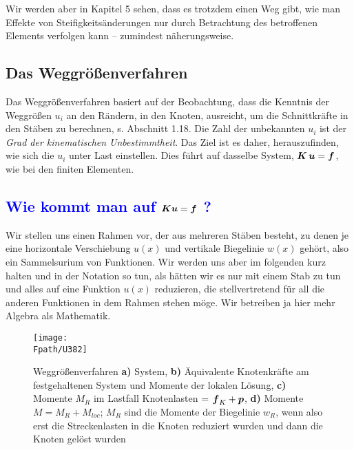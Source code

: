 {Wir werden aber in Kapitel 5 sehen, dass es trotzdem einen Weg gibt, wie man Effekte von Steifigkeits\"{a}nderungen nur durch Betrachtung des betroffenen Elements verfolgen kann -- zumindest n\"{a}herungsweise.
\vspace{-0.5cm}
{\textcolor{sectionTitleBlue}{\section{Das Weggr\"{o}{\ss}enverfahren}}%

Das Weggr\"{o}{\ss}enverfahren basiert auf der Beobachtung, dass die Kenntnis der Weggr\"{o}{\ss}en $u_i$ an den \glq R\"{a}ndern\grq{}, in den Knoten, ausreicht, um die Schnittkr\"{a}fte in den St\"{a}ben zu berechnen, s. Abschnitt 1.18.
 Die Zahl der unbekannten $u_i$ ist der {\em Grad der kinematischen Unbestimmtheit\/}. Das Ziel ist es daher, herauszufinden, wie sich die $u_i$ unter Last einstellen. Dies f\"{u}hrt auf dasselbe System, $\mbox{\boldmath $K$}\,\mbox{\boldmath $u$} = \mbox{\boldmath $f$}$, wie bei den finiten Elementen.

{\textcolor{blue}{\subsection{Wie kommt man auf $\mbox{\boldmath $K$} \mbox{\boldmath $u$} = \mbox{\boldmath $f$}$ ?}}}

Wir stellen uns einen Rahmen vor, der aus mehreren St\"{a}ben besteht, zu denen je eine horizontale Verschiebung $u(x)$ und vertikale Biegelinie $w(x)$ geh\"{o}rt, also ein \glq Sammelsurium\grq{} von Funktionen. Wir werden uns aber im folgenden kurz halten und in der Notation so tun, als h\"{a}tten wir es nur mit einem Stab zu tun und alles auf eine Funktion $u(x)$ reduzieren, die stellvertretend f\"{u}r all die anderen Funktionen in dem Rahmen stehen m\"{o}ge. Wir betreiben ja hier mehr Algebra als Mathematik.
\begin{figure}
\centering
{\texttt{[image: \\Fpath/U382]}}
  \caption{Weggr\"{o}{\ss}enverfahren \textbf{ a)} System, \textbf{ b)} \"{A}quivalente Knotenkr\"{a}fte am festgehaltenen System und Momente der lokalen L\"{o}sung, \textbf{ c)} Momente $M_R$ im Lastfall Knotenlasten = $\mbox{\boldmath $f$}_K + \mbox{\boldmath $p$}$, \textbf{ d)} Momente $M = M_R + M_{loc}$; $M_R$ sind die Momente der Biegelinie $w_R$, wenn also erst die Streckenlasten in die Knoten reduziert wurden und dann die Knoten gel\"{o}st wurden}
  \label{U382}
\end{figure}%

}}
